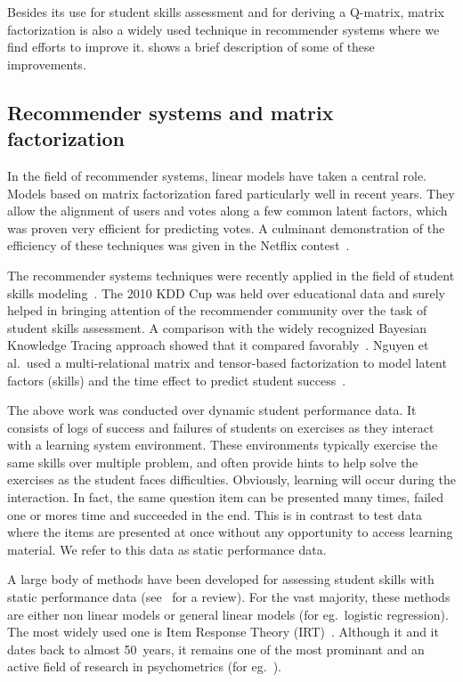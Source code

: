 Besides its use for student skills assessment and for deriving a Q-matrix, matrix factorization is also a widely used technique in recommender systems where we find efforts to improve it.  \citep{koren2009matrix} shows a brief description of some of these improvements.



\subsection{Recommender systems and matrix factorization}

In the field of recommender systems, linear models have taken a central role.  Models based on matrix factorization fared particularly well in recent years.  They allow the alignment of users and votes along a few common latent factors, which was proven very efficient for predicting votes.  A culminant demonstration of the efficiency of these techniques was given in the Netflix contest~\cite{journals/sigkdd/BellK07,conf/kdd/JahrerTL10}.

The recommender systems techniques were recently applied in the field of student skills modeling~\cite{conf/its/CetintasSXH10,Toscher2010,Nguyen2011}.  The 2010 KDD Cup was held over educational data and surely helped in bringing attention of the recommender community over the task of student skills assessment.  A comparison with the widely recognized Bayesian Knowledge Tracing approach showed that it compared favorably~\cite{Nguyen2011}. Nguyen et al.\ used a multi-relational matrix and tensor-based factorization to model latent factors (skills) and the time effect to predict student success~\cite{Nguyen2011,conf/csedu/Thai-NgheDHNS11}.

The above work was conducted over dynamic student performance data.  It consists of logs of success and failures of students on exercises as they interact with a learning system environment.  These environments typically exercise the same skills over multiple problem, and often provide hints to help solve the exercises as the student faces difficulties. Obviously, learning will occur during the interaction. In fact, the same question item can be presented many times, failed one or mores time and succeeded in the end.  This is in contrast to test data where the items are presented at once without any opportunity to access learning material.  We refer to this data as static performance data.

A large body of methods have been developed for assessing student skills with static performance data (see~\cite{Desmarais2011} for a review).  For the vast majority, these methods are either non linear models or general linear models (for eg.~logistic regression). The most widely used one is Item Response Theory (IRT)~\cite{birnbaum:1968}.  Although it and it dates back to almost 50~years, it remains one of the most prominant and an active field of research in psychometrics (for eg.~\cite{bakerKim2004}).

